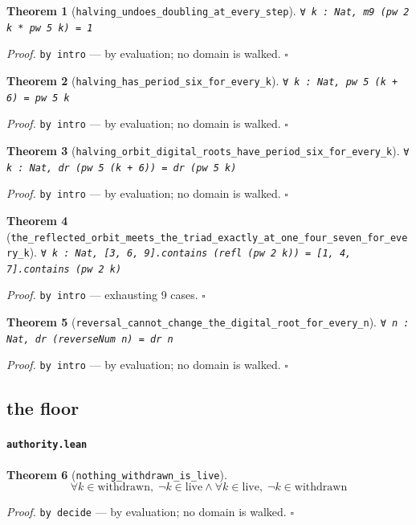 \documentclass[11pt]{article}
\newtheorem{theorem}{Theorem}[section]
\begin{document}
\begin{theorem}[\texttt{halving\_undoes\_doubling\_at\_every\_step}]
\texttt{∀ k : Nat, m9 (pw 2 k * pw 5 k) = 1}
\end{theorem}
\noindent\emph{Proof.} \texttt{by
  intro} --- by evaluation; no domain is walked. \hfill$\square$

\begin{theorem}[\texttt{halving\_has\_period\_six\_for\_every\_k}]
\texttt{∀ k : Nat, pw 5 (k + 6) = pw 5 k}
\end{theorem}
\noindent\emph{Proof.} \texttt{by
  intro} --- by evaluation; no domain is walked. \hfill$\square$

\begin{theorem}[\texttt{halving\_orbit\_digital\_roots\_have\_period\_six\_for\_every\_k}]
\texttt{∀ k : Nat, dr (pw 5 (k + 6)) = dr (pw 5 k)}
\end{theorem}
\noindent\emph{Proof.} \texttt{by
  intro} --- by evaluation; no domain is walked. \hfill$\square$

\begin{theorem}[\texttt{the\_reflected\_orbit\_meets\_the\_triad\_exactly\_at\_one\_four\_seven\_for\_every\_k}]
\texttt{∀ k : Nat, [3, 6, 9].contains (refl (pw 2 k)) = [1, 4, 7].contains (pw 2 k)}
\end{theorem}
\noindent\emph{Proof.} \texttt{by
  intro} --- exhausting 9 cases. \hfill$\square$

\begin{theorem}[\texttt{reversal\_cannot\_change\_the\_digital\_root\_for\_every\_n}]
\texttt{∀ n : Nat, dr (reverseNum n) = dr n}
\end{theorem}
\noindent\emph{Proof.} \texttt{by
  intro} --- by evaluation; no domain is walked. \hfill$\square$

\subsection{the floor}

\paragraph{\texttt{authority.lean}}

\begin{theorem}[\texttt{nothing\_withdrawn\_is\_live}]
\[ \forall k \in \mathrm{withdrawn},\; \lnot k \in \mathrm{live} \land \forall k \in \mathrm{live},\; \lnot k \in \mathrm{withdrawn} \]
\end{theorem}
\noindent\emph{Proof.} \texttt{by decide} --- by evaluation; no domain is walked. \hfill$\square$
\end{document}
